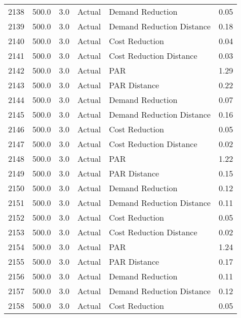 \begin{longtable}{lrrllr}
2138 &        500.0 &     3.0 &         Actual &           Demand Reduction &   0.05 \\
2139 &        500.0 &     3.0 &         Actual &  Demand Reduction Distance &   0.18 \\
2140 &        500.0 &     3.0 &         Actual &             Cost Reduction &   0.04 \\
2141 &        500.0 &     3.0 &         Actual &    Cost Reduction Distance &   0.03 \\
2142 &        500.0 &     3.0 &         Actual &                        PAR &   1.29 \\
2143 &        500.0 &     3.0 &         Actual &               PAR Distance &   0.22 \\
2144 &        500.0 &     3.0 &         Actual &           Demand Reduction &   0.07 \\
2145 &        500.0 &     3.0 &         Actual &  Demand Reduction Distance &   0.16 \\
2146 &        500.0 &     3.0 &         Actual &             Cost Reduction &   0.05 \\
2147 &        500.0 &     3.0 &         Actual &    Cost Reduction Distance &   0.02 \\
2148 &        500.0 &     3.0 &         Actual &                        PAR &   1.22 \\
2149 &        500.0 &     3.0 &         Actual &               PAR Distance &   0.15 \\
2150 &        500.0 &     3.0 &         Actual &           Demand Reduction &   0.12 \\
2151 &        500.0 &     3.0 &         Actual &  Demand Reduction Distance &   0.11 \\
2152 &        500.0 &     3.0 &         Actual &             Cost Reduction &   0.05 \\
2153 &        500.0 &     3.0 &         Actual &    Cost Reduction Distance &   0.02 \\
2154 &        500.0 &     3.0 &         Actual &                        PAR &   1.24 \\
2155 &        500.0 &     3.0 &         Actual &               PAR Distance &   0.17 \\
2156 &        500.0 &     3.0 &         Actual &           Demand Reduction &   0.11 \\
2157 &        500.0 &     3.0 &         Actual &  Demand Reduction Distance &   0.12 \\
2158 &        500.0 &     3.0 &         Actual &             Cost Reduction &   0.05 \\

\end{longtable}
